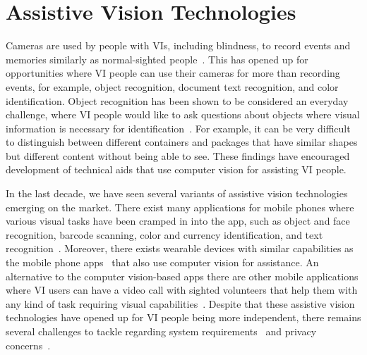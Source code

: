 


\section{Assistive Vision Technologies}\label{sec:assistive_vision} %

Cameras are used by people with VIs, including blindness, to record events and memories similarly as normal-sighted people~\cite{jayant2011supporting}. This has opened up for opportunities where VI people can use their cameras for more than recording events, for example, object recognition, document text recognition, and color identification. Object recognition has been shown to be considered an everyday challenge, where VI people would like to ask questions about objects where visual information is necessary for identification~\cite{brady2013visual}. For example, it can be very difficult to distinguish between different containers and packages that have similar shapes but different content without being able to see. These findings have encouraged development of technical aids that use computer vision for assisting VI people. 

In the last decade, we have seen several variants of assistive vision technologies emerging on the market. There exist many applications for mobile phones where various visual tasks have been cramped in into the app, such as object and face recognition, barcode scanning, color and currency identification, and text recognition~\cite{microsoft2017seeing, clary2018lookout, cloudsight2013taptapsee, envision2018app}. Moreover, there exists wearable devices with similar capabilities as the mobile phone apps~\cite{orcam2019myeye, envision2020glasses} that also use computer vision for assistance. An alternative to the computer vision-based apps there are other mobile applications where VI users can have a video call with sighted volunteers that help them with any kind of task requiring visual capabilities~\cite{bemyeyes2017be, aira2017aira}. Despite that these assistive vision technologies have opened up for VI people being more independent, there remains several challenges to tackle regarding system requirements~\cite{chiu2020assessing, kacorri2017people, pellegrini2019latent} %
and privacy concerns~\cite{ahmed2015privacy, gurari2019vizwiz, hoyle2014privacy}.

